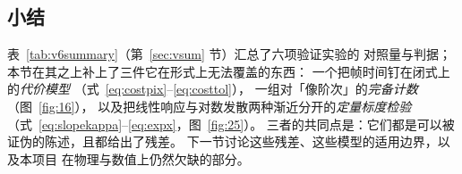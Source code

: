

\subsection{小结}\label{sec:resultssum}

表~\ref{tab:v6summary}（第~\ref{sec:vsum} 节）汇总了六项验证实验的
对照量与判据；本节在其之上补上了三件它在形式上无法覆盖的东西：
一个把帧时间钉在闭式上的\emph{代价模型}
（式~\eqref{eq:costpix}--\eqref{eq:costtol}），
一组对「像阶次」的\emph{完备计数}（图~\ref{fig:16}），
以及把线性响应与对数发散两种渐近分开的\emph{定量标度检验}
（式~\eqref{eq:slopekappa}--\eqref{eq:expx}，图~\ref{fig:25}）。
三者的共同点是：它们都是可以被证伪的陈述，且都给出了残差。
下一节讨论这些残差、这些模型的适用边界，以及本项目
在物理与数值上仍然欠缺的部分。

\FloatBarrier
